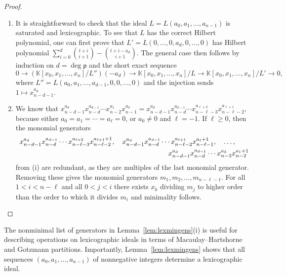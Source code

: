 \documentclass[12pt]{amsart}%
\theoremstyle{definition}%
\newcommand{\hp}{\mathsf{p}}%
\newcommand{\kk}{\mathbb{K}}%
\begin{document}
\begin{proof} $\;$
  \begin{enumerate} 
  \item It is straightforward to check that the ideal $L = L(a_0, a_1,
    \dotsc, a_{n-1})$ is saturated and lexicographic.  To see that $L$
    has the correct Hilbert polynomial, one can first prove that $L' =
    L(0, \dotsc, 0, a_d, 0, \dotsc, 0)$ has Hilbert polynomial
    $\sum_{i = 0}^d \binom{t+i}{i+1} - \binom{t+i-a_d}{i+1}$.  The
    general case then follows by induction on $d = \deg \hp$ and the
    short exact sequence
    \[ 
    0 \to \left( \kk[x_0, x_1, \dotsc, x_n] / L'' \right)(-a_d) \to
    \kk[x_0, x_1, \dotsc, x_n] / L \to \kk[x_0, x_1, \dotsc, x_n] / L'
    \to 0,
    \]
    where $L'' = L(a_0, a_1, \dotsc, a_{d-1}, 0, 0, \dotsc, 0)$ and
    the injection sends $1 \mapsto x_{n-d-1}^{a_{d}}$.

  \item We know that $x_{n-d-1}^{a_{d}} x_{n-d}^{a_{d-1}} \dotsb
    x_{n-2}^{a_{1}} x_{n-1}^{a_{0}} = x_{n-d-1}^{a_{d}}
    x_{n-d}^{a_{d-1}} \dotsb x_{n-\ell-3}^{a_{\ell+2}}
    x_{n-\ell-2}^{a_{\ell+1}}$, because either $a_0 = a_1 = \dotsb =
    a_{\ell} = 0$, or $a_0 \ne 0$ and $\ell = -1$.  If $\ell \ge 0$,
    then the monomial generators
    \begin{align*}
      x_{n-d-1}^{a_{d}} x_{n-d}^{a_{d-1}} \dotsb
      x_{n-\ell-3}^{a_{\ell+2}} x_{n-\ell-2}^{a_{\ell+1}+1}, \quad
      x_{n-d-1}^{a_{d}} x_{n-d}^{a_{d-1}} \dotsb
      x_{n-\ell-2}^{a_{\ell+1}} x_{n-\ell-1}^{a_{\ell}+1},\quad
      \dotsc,\qquad \\
      \hfill x_{n-d-1}^{a_{d}} x_{n-d}^{a_{d-1}} \dotsb
      x_{n-3}^{a_{2}} x_{n-2}^{a_{1}+1}
    \end{align*}
    from (i) are redundant, as they are multiples of the last monomial
    generator.  Removing these gives the monomial generators $m_1,
    m_2, \dotsc, m_{n-\ell-1}$.  For all $1< i < n-\ell$ and all $0 <
    j < i$ there exists $x_k$ dividing $m_j$ to higher order than the
    order to which it divides $m_i$ and minimality follows. \qedhere
  \end{enumerate}
\end{proof}

The nonminimal list of generators in Lemma~\ref{lem:lexmingens}(i) is
useful for describing operations on lexicographic ideals in terms of
Macaulay--Hartshorne and Gotzmann partitions.  Importantly,
Lemma~\ref{lem:lexmingens} shows that all sequences $(a_0, a_1,
\dotsc, a_{n-1})$ of nonnegative integers determine a lexicographic
ideal.
\end{document}
